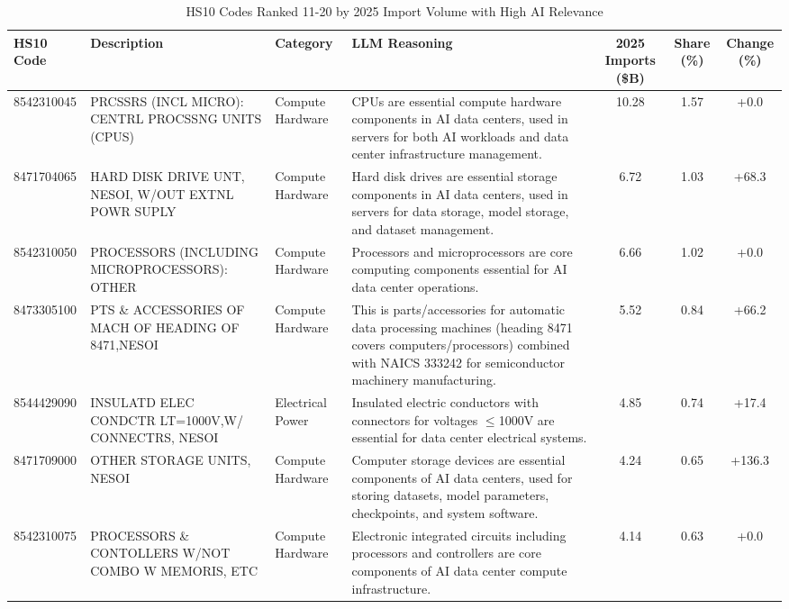\begin{landscape}
\begin{table}[htbp]
\centering
\footnotesize
\caption{HS10 Codes Ranked 11-20 by 2025 Import Volume with High AI Relevance}
\label{tab:top11to20_high_relevance_landscape}
\setlength{\tabcolsep}{2mm}
\renewcommand{\arraystretch}{1.0}
\begin{tabular}{lp{4cm}lp{6cm}ccc}
\toprule
HS10 Code & Description & Category & LLM Reasoning & 2025 Imports (\$B) & Share (\%) & Change (\%) \\
\midrule
8542310045 & {\scriptsize PRCSSRS (INCL MICRO): CENTRL PROCSSNG UNITS (CPUS)} & Compute Hardware & {\scriptsize CPUs are essential compute hardware components in AI data centers, used in servers for both AI workloads and data center infrastructure management.} & 10.28 & 1.57 & +0.0 \\
8471704065 & {\scriptsize HARD DISK DRIVE UNT, NESOI, W/OUT EXTNL POWR SUPLY} & Compute Hardware & {\scriptsize Hard disk drives are essential storage components in AI data centers, used in servers for data storage, model storage, and dataset management.} & 6.72 & 1.03 & +68.3 \\
8542310050 & {\scriptsize PROCESSORS (INCLUDING MICROPROCESSORS): OTHER} & Compute Hardware & {\scriptsize Processors and microprocessors are core computing components essential for AI data center operations.} & 6.66 & 1.02 & +0.0 \\
8473305100 & {\scriptsize PTS \& ACCESSORIES OF MACH OF HEADING OF 8471,NESOI} & Compute Hardware & {\scriptsize This is parts/accessories for automatic data processing machines (heading 8471 covers computers/processors) combined with NAICS 333242 for semiconductor machinery manufacturing.} & 5.52 & 0.84 & +66.2 \\
8544429090 & {\scriptsize INSULATD ELEC CONDCTR LT=1000V,W/ CONNECTRS, NESOI} & Electrical Power & {\scriptsize Insulated electric conductors with connectors for voltages $\leq$1000V are essential for data center electrical systems.} & 4.85 & 0.74 & +17.4 \\
8471709000 & {\scriptsize OTHER STORAGE UNITS, NESOI} & Compute Hardware & {\scriptsize Computer storage devices are essential components of AI data centers, used for storing datasets, model parameters, checkpoints, and system software.} & 4.24 & 0.65 & +136.3 \\
8542310075 & {\scriptsize PROCESSORS \& CONTOLLERS W/NOT COMBO W MEMORIS, ETC} & Compute Hardware & {\scriptsize Electronic integrated circuits including processors and controllers are core components of AI data center compute infrastructure.} & 4.14 & 0.63 & +0.0 \\

\end{tabular}
\end{table}
\end{landscape}
